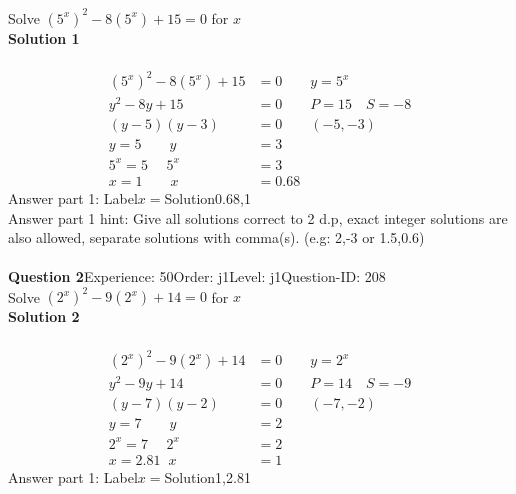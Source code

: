 \documentclass{article}
\begin{document}
Solve $(5^x)^2-8(5^x)+15=0$ for $x$\\[4pt]
\noindent\textbf{Solution 1}\\[2pt]
\\[-35pt]\begin{align*}
(5^x)^2-8(5^x)+15&=0\qquad y=5^x\\[2pt]
y^2-8y+15&=0\qquad P=15 \quad S=-8\\[2pt]
(y-5)(y-3)&=0\qquad (-5,-3)\\[2pt]
y=5 \qquad y&=3\\[2pt]
5^x=5\hspace{16pt} 5^x&=3\\[2pt]
x=1 \qquad x&=0.68
\end{align*}
Answer part 1: \hspace{10pt}Label\hspace{10pt}$x=$\hspace{10pt}Solution\hspace{10pt}0.68,1\\
Answer part 1 hint: \hspace{15pt} Give all solutions correct to 2 d.p, exact integer solutions are also allowed, separate solutions with comma(s). (e.g: 2,-3 or 1.5,0.6)\\
\\[4pt]
\noindent\textbf{Question 2}\hspace{20pt}Experience: 50\hspace{20pt}Order: j1\hspace{20pt}Level: j1\hspace{20pt}Question-ID: 208\\[2pt]
Solve $(2^x)^2-9(2^x)+14=0$ for $x$\\[4pt]
\noindent\textbf{Solution 2}\\[2pt]
\\[-35pt]\begin{align*}
(2^x)^2-9(2^x)+14&=0\qquad y=2^x\\[2pt]
y^2-9y+14&=0\qquad P=14 \quad S=-9\\[2pt]
(y-7)(y-2)&=0\qquad (-7,-2)\\[2pt]
y=7 \qquad y&=2\\[2pt]
2^x=7\hspace{16pt} 2^x&=2\\[2pt]
x=2.81 \hspace{7pt} x&=1
\end{align*}
Answer part 1: \hspace{10pt}Label\hspace{10pt}$x=$\hspace{10pt}Solution\hspace{10pt}1,2.81\\
\end{document}
